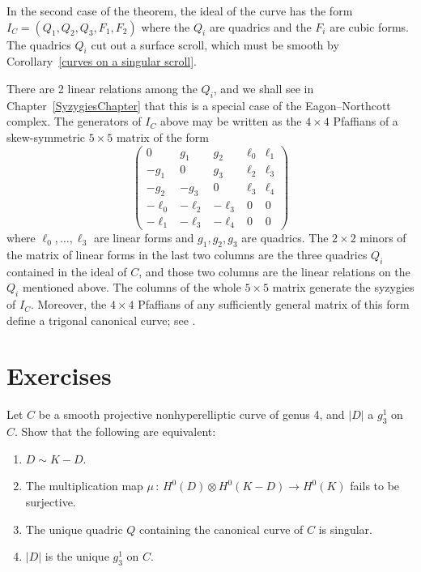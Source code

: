 \begin{fact}
In the second case of the theorem, the ideal of the curve has the form $I_C = (Q_1, Q_2, Q_3, F_1, F_2)$
where the $Q_i$ are quadrics and the $F_i$ are cubic forms.
The quadrics $Q_i$ cut out a surface
scroll,
%
which
must be smooth by Corollary~\ref{curves on a singular scroll}.

There are 2 linear relations among the
$Q_i$, and we shall see in Chapter~\ref{SyzygiesChapter}
that this is a special case of the
Eagon--Northcott complex.
%
The generators of $I_C$ above may be written as the $4\times 4$
Pfaffians
%
of a skew-symmetric $5\times 5$ matrix of the form
$$
\begin{pmatrix}
0&g_1&g_2&\ell_0&\ell_1\\
-g_1&0&g_3&\ell_2&\ell_3\\
-g_2&-g_3&0 &\ell_3&\ell_4\\
-\ell_0&-\ell_2&-\ell_3&0&0\\
-\ell_1&-\ell_3&-\ell_4&0&0
\end{pmatrix}
$$
where $\ell_0,\dots,\ell_3$ are linear forms and $g_1, g_2, g_3$ are quadrics. The
 $2\times 2$
minors of the matrix of linear forms in the last two columns are the three quadrics $Q_i$ contained in the ideal
of $C$, and those two columns are the linear relations on the $Q_i$ mentioned above.
The columns of the whole $5\times 5$ matrix generate the syzygies of $I_C$. Moreover, the
$4\times 4$ Pfaffians of any sufficiently general matrix of this form define a
trigonal canonical curve;
%
see \cite{MR453723}.
%
\end{fact}

\section{Exercises}

\begin{exercise} \label{ex7.1}
Let $C$ be a smooth projective nonhyperelliptic
curve of genus 4,
%
and $|D|$ a $g^1_3$ on $C$. Show that the following are equivalent:
\begin{enumerate}
\item $D \sim K-D$.
\item The multiplication map $\mu \,{:}\, H^0(D) \otimes H^0(K-D) \to H^0(K)$ fails to be sur\-jec\-tive.
\item The unique quadric $Q$ containing the canonical curve of $C$ is singular.
\item $|D|$ is the unique $g^1_3$ on $C$.
\end{enumerate}
\end{exercise}

